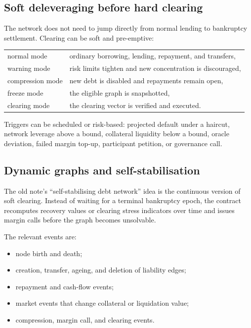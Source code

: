 \documentclass[11pt,oneside]{article}
\begin{document}
\subsection{Soft deleveraging before hard clearing}

The network does not need to jump directly from normal lending to bankruptcy
settlement. Clearing can be soft and pre-emptive:

\begin{center}
\begin{tabular}{ll}
normal mode & ordinary borrowing, lending, repayment, and transfers,\\
warning mode & risk limits tighten and new concentration is discouraged,\\
compression mode & new debt is disabled and repayments remain open,\\
freeze mode & the eligible graph is snapshotted,\\
clearing mode & the clearing vector is verified and executed.
\end{tabular}
\end{center}

Triggers can be scheduled or risk-based: projected default under a haircut,
network leverage above a bound, collateral liquidity below a bound, oracle
deviation, failed margin top-up, participant petition, or governance call.

\subsection{Dynamic graphs and self-stabilisation}

The old note's ``self-stabilising debt network'' idea is the continuous version
of soft clearing. Instead of waiting for a terminal bankruptcy epoch, the
contract recomputes recovery values or clearing stress indicators over time and
issues margin calls before the graph becomes unsolvable.

The relevant events are:

\begin{itemize}[leftmargin=1.5em]
  \item node birth and death;
  \item creation, transfer, ageing, and deletion of liability edges;
  \item repayment and cash-flow events;
  \item market events that change collateral or liquidation value;
  \item compression, margin call, and clearing events.
\end{itemize}
\end{document}
